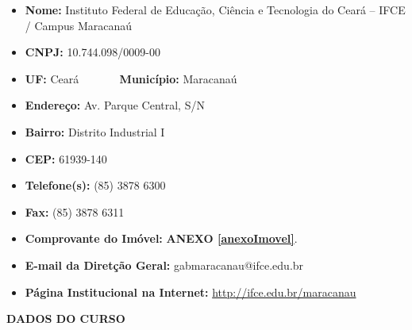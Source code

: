 \documentclass{paper}
\def\web#1{\href{#1}{#1}}
\begin{document}
\begin{itemize}
\item \textbf{Nome:} Instituto Federal de Educação, Ciência e Tecnologia do Ceará – IFCE / Campus Maracanaú

\item\textbf{CNPJ:} 10.744.098/0009-00

\item \textbf{UF:} {Ceará} ~~~~~~ \textbf{Município: }Maracanaú

\item \textbf{Endereço:} Av. Parque Central, S/N

\item\textbf{Bairro:} Distrito Industrial I

\item\textbf{CEP:} 61939-140

\item\textbf{Telefone(s):} (85) 3878 6300

\item\textbf{Fax:} (85) 3878 6311

\item\textbf{Comprovante do Imóvel: } \textbf{ANEXO \ref{anexoImovel}}.


\item\textbf{E-mail da Diretção Geral:} gabmaracanau@ifce.edu.br

\item\textbf{Página Institucional na Internet:} \web{http://ifce.edu.br/maracanau}

\end{itemize}


\clearpage
\thispagestyle{empty}
\begin{center}
\textbf{DADOS DO CURSO}
\end{center}

\vspace{1cm}
\end{document}

